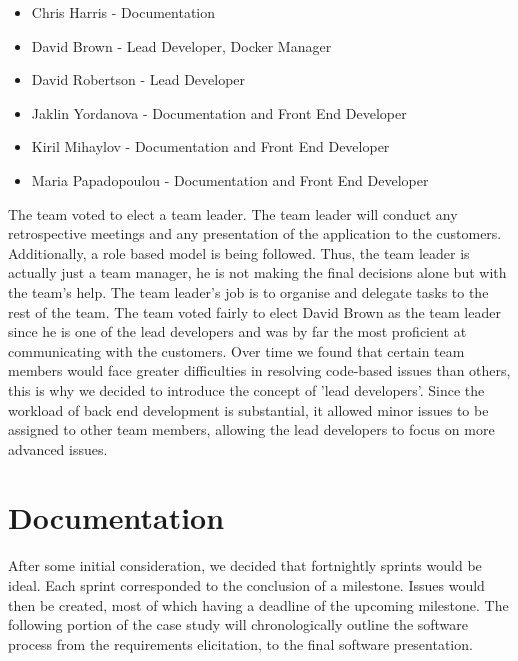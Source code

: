 \documentclass{l3proj}
\begin{document}
\begin{itemize}

\item Chris Harris - Documentation

\item David Brown - Lead Developer, Docker Manager

\item David Robertson - Lead Developer

\item Jaklin Yordanova - Documentation and Front End Developer

\item Kiril Mihaylov - Documentation and Front End Developer

\item Maria Papadopoulou - Documentation and Front End Developer

\end{itemize}
The team voted to elect a team leader. The team leader will conduct any retrospective meetings and any presentation of the application to the customers. Additionally, a role based model is being followed. Thus, the team leader is actually just a team manager, he is not making the final decisions alone but with the team's help. The team leader's job is to organise and delegate tasks to the rest of the team. The team voted fairly to elect David Brown as the team leader since he is one of the lead developers and was by far the most proficient at communicating with the customers. Over time we found that certain team members would face greater difficulties in resolving code-based issues than others, this is why we decided to introduce the concept of 'lead developers'. Since the workload of back end development is substantial, it allowed minor issues to be assigned to other team members, allowing the lead developers to focus on more advanced issues.


\section{Documentation}
\label{documentation}

After some initial consideration, we decided that fortnightly sprints would be ideal. Each sprint corresponded to the conclusion of a milestone. Issues would then be created, most of which having a deadline of the upcoming milestone. The following portion of the case study will chronologically outline the software process from the requirements elicitation, to the final software presentation.
\end{document}
